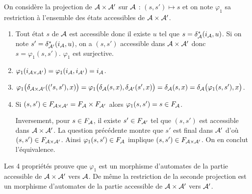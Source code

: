 \begin{Exercise}[label=ques:prod]
On considère  la projection de ${\cal A}\times{\cal A}'$ sur ${\cal A}$ : $(s, s') \mapsto s$ et on note $\varphi_1$ sa  restriction  à l'ensemble des états accessibles de ${\cal A}\times{\cal A}'$.

\begin{enumerate}
  \item Tout état $s$ de ${\cal A}$ est accessible donc il existe $u$ tel que $s = \delta_{\cal A}^*(i_{\cal A}, u)$. Si on note $s' = \delta_{{\cal A}'}^*(i_{\cal A}, u)$, on a $(s, s')$ accessible dans ${\cal A}\times{\cal A}'$ donc $s = \varphi_1(s, s')$. $\varphi_1$ est surjective.
  \item $\varphi_1(i_{{\cal A}\times {\cal A}'}) = \varphi_1(i_{{\cal A}},i_{{\cal A}'})=i_{{\cal A}}$.
  \item $\varphi_1\bigl(\delta_{{\cal A}\times {\cal A}'}(('s, s'), x)\bigr) = \varphi_1\bigl(\delta_{\cal A}(s, x),\delta_{{\cal A}'}(s', x)\bigr)
  = \delta_{\cal A}(s, x)=\delta_{\cal A}\bigl(\varphi_1(s, s'), x \bigr)$.
  \item Si $(s, s') \in F_{{\cal A}\times {\cal A}'}= F_{\cal A}\times F_{{\cal A}'}$ alors $\varphi_1(s, s') = s \in F_{\cal A}$.
  
  Inversement, pour $s \in F_{\cal A}$, il existe $s'\in F_{{\cal A}'}$ tel que $(s, s')$ est accessible dans ${\cal A}\times{\cal A}'$. La question précédente montre que $s'$ est final dans ${\cal A}'$ d'où $(s, s')\in F_{{\cal A}\times {\cal A}'}$. Ainsi $\varphi_1(s, s') \in  F_{\cal A}$ implique $(s, s')\in F_{{\cal A}\times {\cal A}'}$.
    On en conclut l'équivalence.
\end{enumerate}
Les 4 propriétés prouve que $\varphi_1$ est un morphisme d'automates de la partie accessible de ${\cal A}\times{\cal A}'$ vers ${\cal A}$.
De même la restriction de la seconde projection est un morphisme d'automates de la partie accessible de ${\cal A}\times{\cal A}'$ vers ${\cal A}'$.
\end{Exercise}
